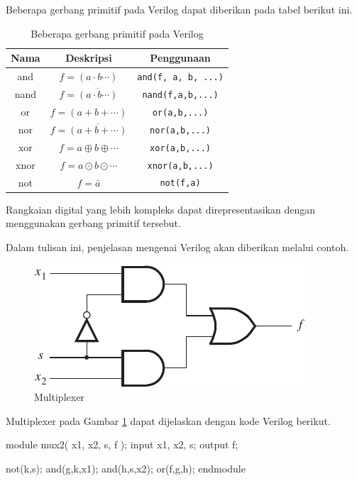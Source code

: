 Beberapa gerbang primitif pada Verilog dapat diberikan
pada tabel berikut ini.
\begin{table}[h!]
\centering
\begin{tabular}{|ccc|}
\hline
Nama & Deskripsi & Penggunaan \\
\hline\hline
and & $f = (a \cdot b \cdots )$ & \verb|and(f, a, b, ...)| \\
nand & $f = \overline{(a \cdot b \cdots)}$ & \verb|nand(f,a,b,...)| \\
or & $f = (a + b + \cdots)$ & \verb|or(a,b,...)| \\
nor & $f = \overline{(a + b + \cdots)}$ & \verb|nor(a,b,...)| \\
xor & $f = a \oplus b \oplus \cdots $ & \verb|xor(a,b,...)| \\
xnor & $f = a \odot b \odot \cdots $ & \verb|xnor(a,b,...)| \\
not & $f = \bar{a}$ & \verb|not(f,a)| \\
\hline
\end{tabular}
\par
\caption{Beberapa gerbang primitif pada Verilog}
\end{table}

Rangkaian digital yang lebih kompleks
dapat direpresentasikan dengan menggunakan gerbang primitif tersebut.

Dalam tulisan ini, penjelasan mengenai Verilog akan diberikan
melalui contoh.

\begin{figure}[h]
\centering
\includegraphics[scale=1.0]{images/fig_2_36.pdf}
\par
\caption{Multiplexer}\label{fig:mux2}
\end{figure}

 Multiplexer pada
Gambar \ref{fig:mux2} dapat dijelaskan dengan kode Verilog berikut.

{
\begin{verilogcode}
module mux2( x1, x2, s, f );
  input x1, x2, s;
  output f;

  not(k,s);
  and(g,k,x1);
  and(h,s,x2);
  or(f,g,h);
endmodule
\end{verilogcode}
}

